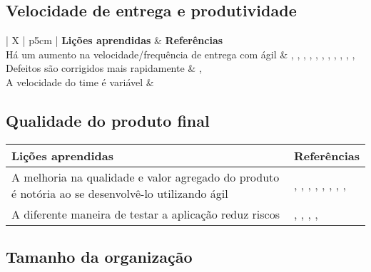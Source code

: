 \subsection{Velocidade de entrega e produtividade}

\begin{table}[H]
	\centering
	\begin{tabularx}{\linewidth}{ | X | p{5cm} | } \hline \textbf{Lições aprendidas} & \textbf{Referências} \\ \hline
		Há um aumento na velocidade/frequência de entrega com ágil & \cite{Adobe2012}, \cite{Fitzgerald2013}, \cite{Microsoft2013}, \cite{Cisco2011}, \cite{Korhonen2010}, \cite{Eunha2012}, \cite{Claudia2013}, \cite{Stefano2013}, \cite{Queiroz2013}, \cite{Maciel2013}, \cite{Hui2013}, \cite{Ahmed2008} \\ \hline
		Defeitos são corrigidos mais rapidamente & \cite{Microsoft2013}, \cite{Korhonen2010} \\ \hline
		A velocidade do time é variável & \cite{Piegas2012} \\ \hline
	\end{tabularx}
\end{table}

\subsection{Qualidade do produto final}

\begin{table}[H]
	\centering
	\begin{tabularx}{\linewidth}{ | X | p{5cm} | } \hline \textbf{Lições aprendidas} & \textbf{Referências} \\ \hline
		A melhoria na qualidade e valor agregado do produto é notória ao se desenvolvê-lo utilizando ágil & \cite{Adobe2012}, \cite{Fitzgerald2013}, \cite{Bustard2013}, \cite{Lapham2012}, \cite{Eunha2012}, \cite{Claudia2013}, \cite{Parzinello2012}, \cite{Maciel2013}, \cite{Ahmed2008} \\ \hline
		A diferente maneira de testar a aplicação reduz riscos & \cite{Korhonen2010}, \cite{Lapham2012}, \cite{Eunha2012}, \cite{Parzinello2012}, \cite{Ahmed2008} \\ \hline
	\end{tabularx}
\end{table}

\subsection{Tamanho da organização}

